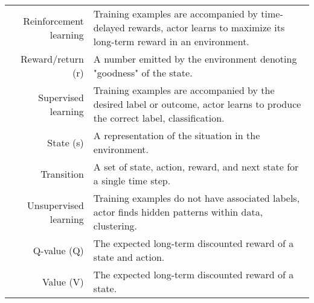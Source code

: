 \begin{longtable}{@{}r|Y@{}}
	Reinforcement learning & Training examples are accompanied by time-delayed rewards, actor learns to maximize its long-term reward in an environment. \\
	Reward/return (r) & A number emitted by the environment denoting "goodness" of the state. \\
	Supervised learning & Training examples are accompanied by the desired label or outcome, actor learns to produce the correct label, classification. \\
	State (s) & A representation of the situation in the environment. \\
	Transition & A set of state, action, reward, and next state for a single time step. \\
	Unsupervised learning & Training examples do not have associated labels, actor finds hidden patterns within data, clustering.  \\
	Q-value (Q) & The expected long-term discounted reward of a state and action. \\
	Value (V) & The expected long-term discounted reward of a state. \\
	\bottomrule 
\end{longtable} 
